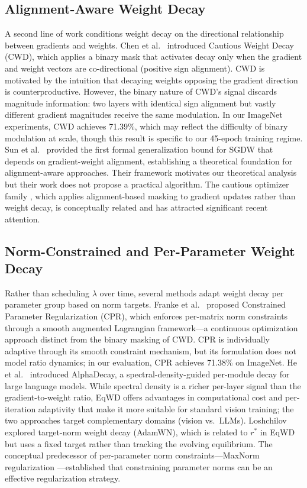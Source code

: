 \documentclass{article}
\begin{document}
\subsection{Alignment-Aware Weight Decay}
\label{sec:related_alignment}

A second line of work conditions weight decay on the directional
relationship between gradients and weights. Chen et
al.~\citep{chen2026cwd} introduced Cautious Weight Decay (CWD), which
applies a binary mask that activates decay only when the gradient and
weight vectors are co-directional (positive sign alignment). CWD is
motivated by the intuition that decaying weights opposing the gradient
direction is counterproductive. However, the binary nature of CWD's
signal discards magnitude information: two layers with identical sign
alignment but vastly different gradient magnitudes receive the same
modulation. In our ImageNet experiments, CWD achieves 71.39\%, which may
reflect the difficulty of binary modulation at scale, though this result
is specific to our 45-epoch training regime. Sun et
al.~\citep{sun2025cvpr} provided the first formal generalization bound
for SGDW that depends on gradient-weight alignment, establishing a
theoretical foundation for alignment-aware approaches. Their framework
motivates our theoretical analysis but their work does not propose a
practical algorithm. The cautious optimizer family
\citep{luo2024cautious}, which applies alignment-based masking to
gradient updates rather than weight decay, is conceptually related and
has attracted significant recent attention.

\subsection{Norm-Constrained and Per-Parameter Weight Decay}
\label{sec:related_norm}

Rather than scheduling $\lambda$ over time, several methods adapt
weight decay per parameter group based on norm targets. Franke et
al.~\citep{franke2024cpr} proposed Constrained Parameter Regularization
(CPR), which enforces per-matrix norm constraints through a smooth
augmented Lagrangian framework---a continuous optimization approach
distinct from the binary masking of CWD. CPR is individually adaptive
through its smooth constraint mechanism, but its formulation does not
model ratio dynamics; in our evaluation, CPR achieves 71.38\% on
ImageNet. He et al.~\citep{he2025alphadecay} introduced AlphaDecay, a
spectral-density-guided per-module decay for large language models.
While spectral density is a richer per-layer signal than the
gradient-to-weight ratio, EqWD offers advantages in computational cost
and per-iteration adaptivity that make it more suitable for standard
vision training; the two approaches target complementary domains (vision
vs.~LLMs). Loshchilov \citep{loshchilov2023weightnorm} explored
target-norm weight decay (AdamWN), which is related to $r^*$ in EqWD
but uses a fixed target rather than tracking the evolving equilibrium.
The conceptual predecessor of per-parameter norm constraints---MaxNorm
regularization
\citep{hinton2012improving, srivastava2014dropout}---established that
constraining parameter norms can be an effective regularization
strategy.
\end{document}
